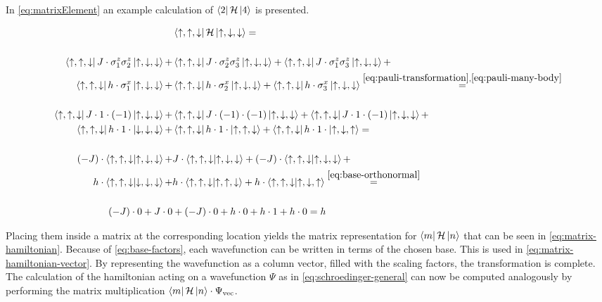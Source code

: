 In \autoref{eq:matrixElement} an example calculation of $\bra{2}\mathcal{H}\ket{4}$ is presented.

\begin{equation}
    \label{eq:matrixElement}
    \begin{split}
        &\bra{\up, \up, \down} \hamiltonian \ket{\up, \down, \down} = \\\\ %
         \bra{\up, \up, \down} J\cdot \sigma^z_1\sigma^z_2 \ket{\up, \down, \down} +
         &\bra{\up, \up, \down} J\cdot \sigma^z_2\sigma^z_3 \ket{\up, \down, \down} +
         \bra{\up, \up, \down} J\cdot \sigma^z_1\sigma^z_3 \ket{\up, \down, \down} +\\
         \bra{\up, \up, \down} h\cdot \sigma^x_1 \ket{\up, \down, \down} +
         &\bra{\up, \up, \down} h\cdot \sigma^x_2 \ket{\up, \down, \down} +
         \bra{\up, \up, \down} h\cdot \sigma^x_3 \ket{\up, \down, \down}\stackrel{\ref{eq:pauli-transformation}, \ref{eq:pauli-many-body}}{=}\\\\ %
          \bra{\up, \up, \down} J\cdot  1 \cdot (-1) \ket{\up, \down, \down} +
         & \bra{\up, \up, \down} J\cdot (-1) \cdot (-1) \ket{\up, \down, \down} +
          \bra{\up, \up, \down} J\cdot  1 \cdot (-1) \ket{\up, \down, \down} +\\
          \bra{\up, \up, \down} h\cdot  1 \cdot \ket{\down, \down, \down} +
         & \bra{\up, \up, \down} h\cdot 1 \cdot \ket{\up, \up, \down} +
          \bra{\up, \up, \down} h\cdot  1 \cdot \ket{\up, \down, \up} =\\\\ %
          (-J)\cdot      \bra{\up, \up, \down}  \ket{\up, \down, \down} +
         & J\cdot        \bra{\up, \up, \down} \ket{\up, \down, \down} +
          (-J)\cdot      \bra{\up, \up, \down}  \ket{\up, \down, \down} +\\
          h\cdot         \bra{\up, \up, \down}  \ket{\down, \down, \down} +
         & h\cdot        \bra{\up, \up, \down} \ket{\up, \up, \down} +
          h\cdot         \bra{\up, \up, \down}  \ket{\up, \down, \up}\stackrel{\ref{eq:base-orthonormal}}{=}\\\\ %
          (-J)\cdot 0 + J\cdot 0 &+  (-J)\cdot 0 + h\cdot 0  + h\cdot 1 + h\cdot 0   = h 
    \end{split}
\end{equation}

Placing them inside a matrix at the corresponding location yields the matrix representation for $\bra{m}\mathcal{H}\ket{n}$ that can be seen in \autoref{eq:matrix-hamiltonian}.
Because of \autoref{eq:base-factors}, each wavefunction can be written in terms of the chosen base. This is used in \autoref{eq:matrix-hamiltonian-vector}. By representing the wavefunction as a column vector, filled with the scaling factors, the transformation is complete. 
The calculation of the hamiltonian \hamiltonian acting on a wavefunction $\Psi$ as in \autoref{eq:schroedinger-general} can now be computed analogously by performing the matrix multiplication $\bra{m}\mathcal{H}\ket{n} \cdot \Psi_\mathrm{vec}$.

